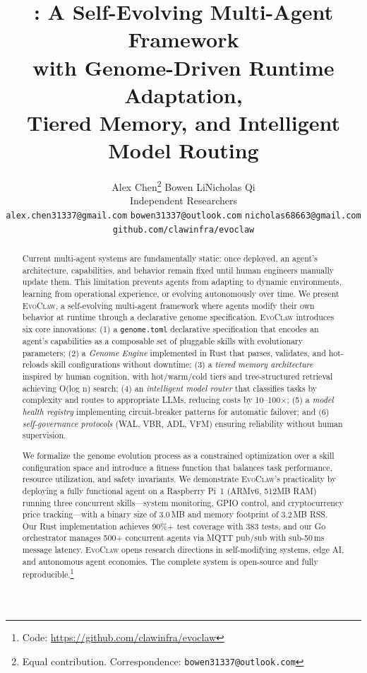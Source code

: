 \documentclass{article}
\title{\evoclaw{}: A Self-Evolving Multi-Agent Framework \\with Genome-Driven Runtime Adaptation, \\Tiered Memory, and Intelligent Model Routing}
\author{
  Alex Chen\thanks{Equal contribution. Correspondence: \texttt{bowen31337@outlook.com}} \quad Bowen Li\footnotemark[1] \quad Nicholas Qi\footnotemark[1] \\[0.3em]
  Independent Researchers \\
  \texttt{alex.chen31337@gmail.com} \quad \texttt{bowen31337@outlook.com} \quad \texttt{nicholas68663@gmail.com} \\
  \texttt{github.com/clawinfra/evoclaw}
}
\newcommand{\evoclaw}{\textsc{EvoClaw}}
\newcommand{\genome}{\texttt{genome.toml}}
\begin{document}
\maketitle

\begin{abstract}
Current multi-agent systems are fundamentally static: once deployed, an agent's architecture, capabilities, and behavior remain fixed until human engineers manually update them. This limitation prevents agents from adapting to dynamic environments, learning from operational experience, or evolving autonomously over time. We present \evoclaw{}, a self-evolving multi-agent framework where agents modify their own behavior at runtime through a declarative genome specification. \evoclaw{} introduces six core innovations: (1) a \genome{} declarative specification that encodes an agent's capabilities as a composable set of pluggable skills with evolutionary parameters; (2) a \textit{Genome Engine} implemented in Rust that parses, validates, and hot-reloads skill configurations without downtime; (3) a \textit{tiered memory architecture} inspired by human cognition, with hot/warm/cold tiers and tree-structured retrieval achieving O(log n) search; (4) an \textit{intelligent model router} that classifies tasks by complexity and routes to appropriate LLMs, reducing costs by 10--100$\times$; (5) a \textit{model health registry} implementing circuit-breaker patterns for automatic failover; and (6) \textit{self-governance protocols} (WAL, VBR, ADL, VFM) ensuring reliability without human supervision.

We formalize the genome evolution process as a constrained optimization over a skill configuration space and introduce a fitness function that balances task performance, resource utilization, and safety invariants. We demonstrate \evoclaw{}'s practicality by deploying a fully functional agent on a Raspberry Pi~1 (ARMv6, 512MB RAM) running three concurrent skills---system monitoring, GPIO control, and cryptocurrency price tracking---with a binary size of 3.0\,MB and memory footprint of 3.2\,MB RSS. Our Rust implementation achieves 90\%+ test coverage with 383 tests, and our Go orchestrator manages 500+ concurrent agents via MQTT pub/sub with sub-50\,ms message latency. \evoclaw{} opens research directions in self-modifying systems, edge AI, and autonomous agent economies. The complete system is open-source and fully reproducible.\footnote{Code: \url{https://github.com/clawinfra/evoclaw}}
\end{abstract}
\end{document}
